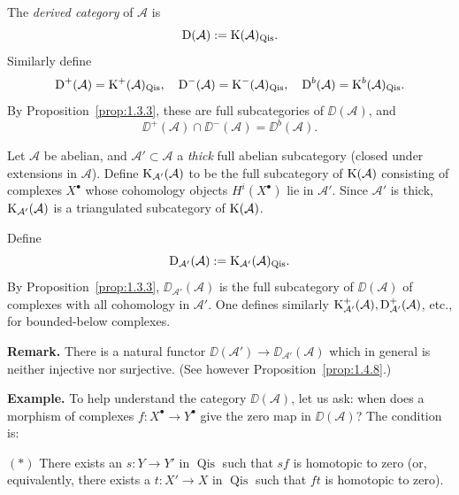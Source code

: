 \begin{definition*}
The \emph{derived category} of $\mathcal{A}$ is
\[
\operatorname{D}(\mathcal{A}) := \operatorname{K}(\mathcal{A})_{\operatorname{Qis}}.
\]
Similarly define
\[
\operatorname{D}^+(\mathcal{A})=\operatorname{K}^+(\mathcal{A})_{\operatorname{Qis}},\quad
\operatorname{D}^-(\mathcal{A})=\operatorname{K}^-(\mathcal{A})_{\operatorname{Qis}},\quad
\operatorname{D}^b(\mathcal{A})=\operatorname{K}^b(\mathcal{A})_{\operatorname{Qis}}.
\]
By Proposition~\ref{prop:1.3.3}, these are full subcategories of $\DD(\mathcal{A})$, and
\[
\DD^+(\mathcal{A})\cap \DD^-(\mathcal{A}) = \DD^b(\mathcal{A}).
\]
\end{definition*}

\begin{definition*}
Let $\mathcal{A}$ be abelian, and $\mathcal{A}'\subset\mathcal{A}$ a \emph{thick} full abelian subcategory (closed under extensions in $\mathcal{A}$). Define $\operatorname{K}_{\mathcal{A}'}(\mathcal{A})$ to be the full subcategory of $\operatorname{K}(\mathcal{A})$ consisting of complexes $X^\bullet$ whose cohomology objects $H^i(X^\bullet)$ lie in $\mathcal{A}'$. Since $\mathcal{A}'$ is thick, $\operatorname{K}_{\mathcal{A}'}(\mathcal{A})$ is a triangulated subcategory of $\operatorname{K}(\mathcal{A})$.

Define
\[
\operatorname{D}_{\mathcal{A}'}(\mathcal{A}) := \operatorname{K}_{\mathcal{A}'}(\mathcal{A})_{\operatorname{Qis}}.
\]
By Proposition~\ref{prop:1.3.3}, $\DD_{\mathcal{A}'}(\mathcal{A})$ is the full subcategory of $\DD(\mathcal{A})$ of complexes with all cohomology in $\mathcal{A}'$. One defines similarly $\operatorname{K}_{\mathcal{A}'}^+(\mathcal{A}), \operatorname{D}_{\mathcal{A}'}^+(\mathcal{A})$, etc., for bounded-below complexes.
\end{definition*}

\noindent\textbf{Remark.} There is a natural functor
$\DD(\mathcal{A}')\to\DD_{\mathcal{A}'}(\mathcal{A})$ which in general is neither injective nor surjective. (See however Proposition~\ref{prop:1.4.8}.)

\textbf{Example.} To help understand the category $\DD(\mathcal{A})$, let us ask: when does a morphism of complexes $f\colon X^\bullet\to Y^\bullet$ give the zero map in $\DD(\mathcal{A})$? The condition is:

$(*)$ There exists an $s\colon Y\to Y'$ in $\operatorname{Qis}$ such that $sf$ is homotopic to zero (or, equivalently, there exists a $t\colon X'\to X$ in $\operatorname{Qis}$ such that $ft$ is homotopic to zero).

